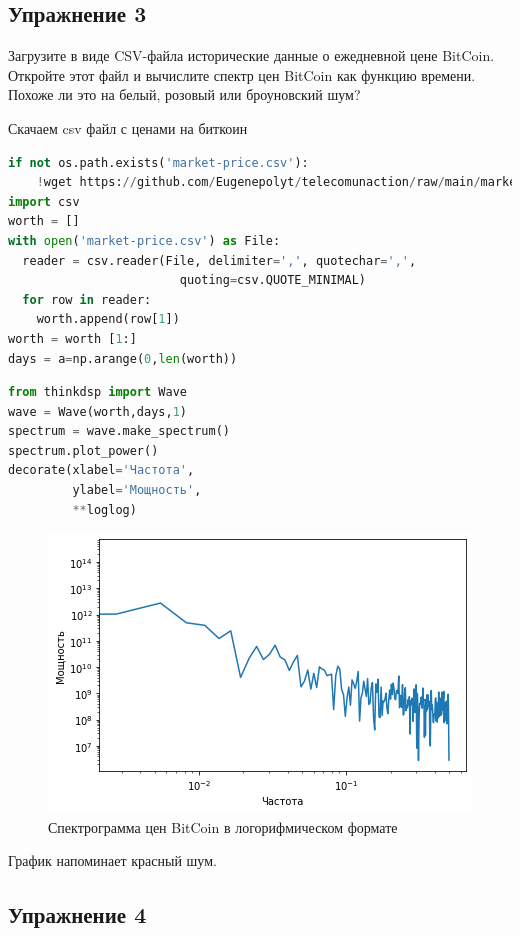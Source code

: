 \subsection{Упражнение 3}

Загрузите в виде CSV-файла исторические данные о ежедневной цене BitCoin. Откройте этот файл и вычислите спектр цен BitCoin как функцию времени. Похоже ли это на белый, розовый или броуновский шум?

Скачаем csv файл с ценами на биткоин

\begin{lstlisting}[language=Python]
if not os.path.exists('market-price.csv'):
    !wget https://github.com/Eugenepolyt/telecomunaction/raw/main/market-price.csv
import csv
worth = []
with open('market-price.csv') as File:
  reader = csv.reader(File, delimiter=',', quotechar=',',
                        quoting=csv.QUOTE_MINIMAL)
  for row in reader:
    worth.append(row[1])
worth = worth [1:]
days = a=np.arange(0,len(worth))
\end{lstlisting}
\begin{lstlisting}[language=Python]
from thinkdsp import Wave
wave = Wave(worth,days,1)
spectrum = wave.make_spectrum()
spectrum.plot_power()
decorate(xlabel='Частота',
         ylabel='Мощность', 
         **loglog)
\end{lstlisting}

\begin{figure}[H]
	\begin{center}
		\includegraphics[scale=1]{fig/lab04/lab04_5.png}
		\caption{Спектрограмма цен BitCoin в логорифмическом формате}
	\end{center}
\end{figure}

График напоминает красный шум.

\subsection{Упражнение 4}

